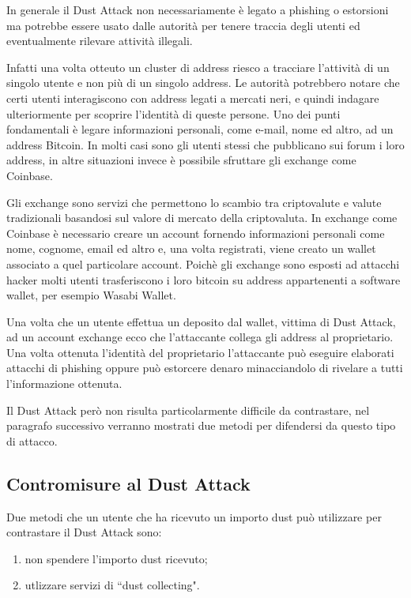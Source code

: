 In generale il Dust Attack non necessariamente è legato a phishing o estorsioni ma potrebbe essere usato dalle autorità per tenere traccia degli utenti ed eventualmente rilevare attività illegali.

Infatti una volta otteuto un cluster di address riesco a tracciare l'attività di un singolo utente e non più di un singolo address. Le autorità potrebbero notare che certi utenti interagiscono con address legati a mercati neri, e quindi indagare ulteriormente per scoprire l'identità di queste persone. Uno dei punti fondamentali è legare informazioni personali, come e-mail, nome ed altro, ad un address Bitcoin. In molti casi sono gli utenti stessi che pubblicano sui forum i loro address, in altre situazioni invece è possibile sfruttare gli exchange come Coinbase.

Gli exchange sono servizi che permettono lo scambio tra criptovalute e valute tradizionali basandosi sul valore di mercato della criptovaluta. In exchange come Coinbase è necessario creare un account fornendo informazioni personali come nome, cognome, email ed altro e, una volta registrati, viene creato un wallet associato a quel particolare account. Poichè gli exchange sono esposti ad attacchi hacker molti utenti trasferiscono i loro bitcoin su address appartenenti a software wallet, per esempio Wasabi Wallet.

Una volta che un utente effettua un deposito dal wallet, vittima di Dust Attack, ad un account exchange ecco che l'attaccante collega gli address al proprietario. Una volta ottenuta l'identità del proprietario l'attaccante può eseguire elaborati attacchi di phishing oppure può estorcere denaro minacciandolo di rivelare a tutti l'informazione ottenuta. 

Il Dust Attack però non risulta particolarmente difficile da contrastare, nel paragrafo successivo verranno mostrati due metodi per difendersi da questo tipo di attacco.
\subsection{Contromisure al Dust Attack}
Due metodi che un utente che ha ricevuto un importo dust può utilizzare per contrastare il Dust Attack sono:
    \begin{enumerate}
        \item non spendere l'importo dust ricevuto; 
        \item utlizzare servizi di ``dust collecting". 
    \end{enumerate}
    
